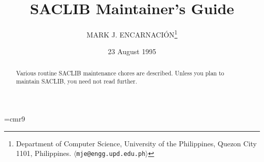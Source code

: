 

\title{SACLIB Maintainer's Guide}

\author[M. J. Encarnaci\'on]{MARK J. ENCARNACI\'ON\thanks{
Department of Computer Science, University of the Philippines,
Quezon City 1101, Philippines.
$\langle${\tt mje@engg.upd.edu.ph}$\rangle$}}

\date{23 August 1995}

\font\ninerm=cmr9
\let\mc=\ninerm %
\def\CEE/{{\mc C\spacefactor1000}}
\def\SACLIB/{{\mc SACLIB\spacefactor1000}}

\def\argu#1{{$\langle${\em #1\/}$\rangle$}}




\maketitle

\begin{abstract}
Various routine SACLIB maintenance chores are described.
Unless you plan to maintain SACLIB, you need not
read further.
\end{abstract}


